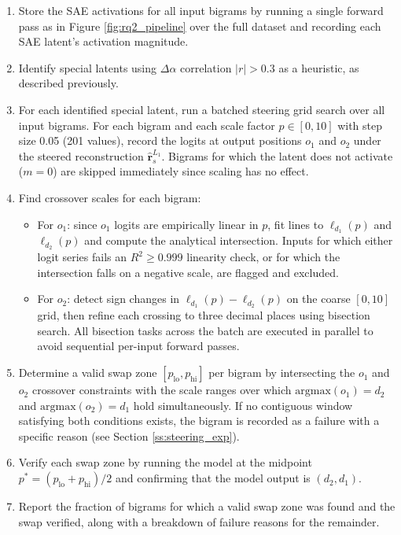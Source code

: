 \begin{enumerate}
    \item Store the SAE activations for all input bigrams by running a single 
    forward pass as in Figure \ref{fig:rq2_pipeline} over the full dataset and recording each SAE latent's activation 
    magnitude.
    \item Identify special latents using $\Delta \alpha$ correlation $|r|>0.3$ as a heuristic, 
    as described previously.
    \item For each identified special latent, run a batched steering grid search 
    over all input bigrams. For each bigram and each scale factor 
    $p \in [0,10]$ with step size 0.05 (201 values), record the logits at 
    output positions $o_1$ and $o_2$ under the steered reconstruction 
    $\hat{\boldsymbol{r}}_{s}^{L_1}$. Bigrams for which the latent does not 
    activate ($m = 0$) are skipped immediately since scaling has no effect.
    
    \item Find crossover scales for each bigram:
    \begin{itemize}
        \item For $o_1$: since $o_1$ logits are empirically linear in $p$, fit 
        lines to $\ell_{d_1}(p)$ and $\ell_{d_2}(p)$ and compute the analytical 
        intersection. Inputs for which either logit series fails an $R^2 \geq 0.999$ 
        linearity check, or for which the intersection falls on a negative scale, are flagged and excluded.
        \item For $o_2$: detect sign changes in $\ell_{d_1}(p) - \ell_{d_2}(p)$ 
        on the coarse $[0, 10]$ grid, then refine each crossing to three decimal places using 
        bisection search. All bisection tasks across the batch are executed in parallel to 
        avoid sequential per-input forward passes.
    \end{itemize}
    
    \item Determine a valid swap zone $[p_{\mathrm{lo}}, p_{\mathrm{hi}}]$ per 
    bigram by intersecting the $o_1$ and $o_2$ crossover constraints with the 
    scale ranges over which $\mathrm{argmax}(o_1) = d_2$ and 
    $\mathrm{argmax}(o_2) = d_1$ hold simultaneously. If no contiguous window 
    satisfying both conditions exists, the bigram is recorded as a failure with a 
    specific reason (see Section \ref{ss:steering_exp}).
    
    \item Verify each swap zone by running the model at the midpoint 
    $p^* = (p_{\mathrm{lo}} + p_{\mathrm{hi}})/2$ and confirming that the model 
    output is $(d_2, d_1)$.
    
    \item Report the fraction of bigrams for which a valid swap zone was found and 
    the swap verified, along with a breakdown of failure reasons for the remainder.
\end{enumerate}


